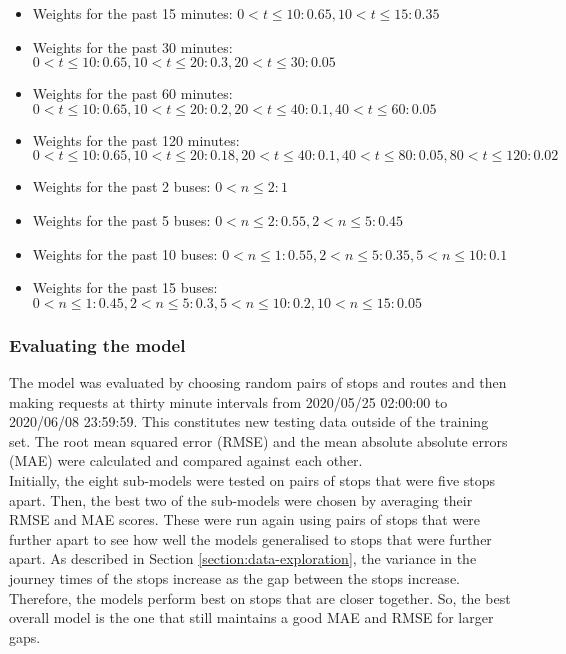 \begin{itemize}
    \item Weights for the past 15 minutes: $0 < t \leq 10: 0.65, 10 < t \leq 15: 0.35$
    \item Weights for the past 30 minutes: $0 < t \leq 10: 0.65, 10 < t \leq 20: 0.3, 20 < t \leq 30: 0.05$ 
    \item Weights for the past 60 minutes: $0 < t \leq 10: 0.65, 10 < t \leq 20: 0.2, 20 < t \leq 40: 0.1, 40 < t \leq 60: 0.05$ 
    \item Weights for the past 120 minutes:$0 < t \leq 10: 0.65, 10 < t \leq 20: 0.18, 20 < t \leq 40: 0.1, 40 < t \leq 80: 0.05, 80 < t \leq 120: 0.02$ 
    \item Weights for the past 2 buses: $0 < n \leq 2: 1$
    \item Weights for the past 5 buses: $0 < n \leq 2: 0.55, 2 < n \leq 5: 0.45$
    \item Weights for the past 10 buses: $0 < n \leq 1: 0.55, 2 < n \leq 5: 0.35, 5 < n \leq 10: 0.1$
    \item Weights for the past 15 buses: $0 < n \leq 1: 0.45, 2 < n \leq 5: 0.3, 5 < n \leq 10: 0.2, 10 < n \leq 15: 0.05$
\end{itemize}

\subsubsection{Evaluating the model}

The model was evaluated by choosing random pairs of stops and routes and then making requests at thirty minute intervals from 2020/05/25 02:00:00 to 2020/06/08 23:59:59. This constitutes new testing data outside of the training set. The root mean squared error (RMSE) and the mean absolute absolute errors (MAE) were calculated and compared against each other. \\

Initially, the eight sub-models were tested on pairs of stops that were five stops apart. Then, the best two of the sub-models were chosen by averaging their RMSE and MAE scores. These were run again using pairs of stops that were further apart to see how well the models generalised to stops that were further apart. As described in Section \ref{section:data-exploration}, the variance in the journey times of the stops increase as the gap between the stops increase. Therefore, the models perform best on stops that are closer together. So, the best overall model is the one that still maintains a good MAE and RMSE for larger gaps.

